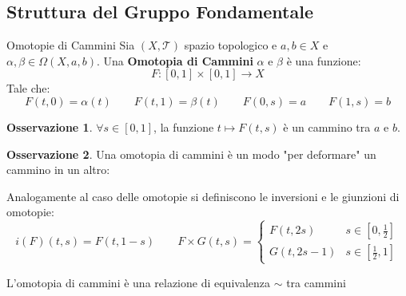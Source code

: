 \documentclass[11pt,a4paper,twoside]{article}
\theoremstyle{definition}
\newtheorem*{oss}{Osservazione}
\begin{document}
\subsection{Struttura del Gruppo Fondamentale}

\begin{defn}{Omotopie di Cammini}{}
	Sia $(X, \mathcal T)$ spazio topologico e $a,b \in X$ e $\alpha, \beta \in \Omega(X, a, b)$. Una \textbf{Omotopia di Cammini} $\alpha$ e $\beta$ è una funzione:
	\[ F:[0,1] \times [0,1] \to X \]
	Tale che:
	\[ F(t,0) = \alpha(t)\qquad F(t,1) = \beta(t) \qquad F(0,s) = a\qquad F(1,s) = b \]
\end{defn}

\begin{oss}
	$\forall s \in [0,1]$, la funzione $t \mapsto F(t,s)$ è un cammino tra $a$ e $b$.
\end{oss}

\begin{oss}
	Una omotopia di cammini è un modo "per deformare" un cammino in un altro:
	\begin{center}
	\end{center}
	Analogamente al caso delle omotopie si definiscono le inversioni e le giunzioni di omotopie:
	\[ i(F)(t,s) = F(t, 1-s)\qquad F \times G(t,s) = \begin{cases}
		F(t,2s) & s \in [0, \frac 12]\\
		G(t, 2s-1) & s \in[\frac 12, 1]
	\end{cases}\]
\end{oss}

\begin{lemma}{}{}
	L'omotopia di cammini è una relazione di equivalenza $\sim$ tra cammini
\end{lemma}
\end{document}
